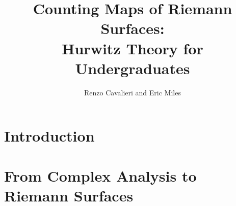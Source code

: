 


\title{Counting Maps of Riemann Surfaces: \\ Hurwitz Theory for Undergraduates}

\author{Renzo Cavalieri and Eric Miles}

\date{}

\maketitle





\tableofcontents



\chapter{Introduction}
\label{introduction}






\chapter{From Complex Analysis to Riemann Surfaces}
\label{complexAnalysis}



\begin{theorem}
\label{openMappingThm}
\end{theorem}



\begin{theorem}
\label{inverseFunctionThm}
\end{theorem}







